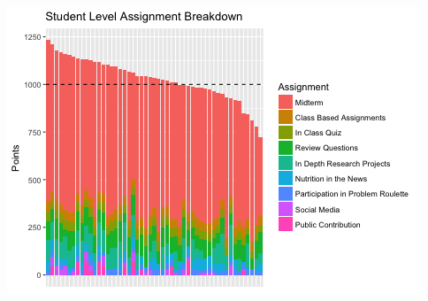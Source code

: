 \documentclass[]{article}
\begin{document}
\includegraphics{figures/points-from-assessments-individual-1.png}
\end{document}

